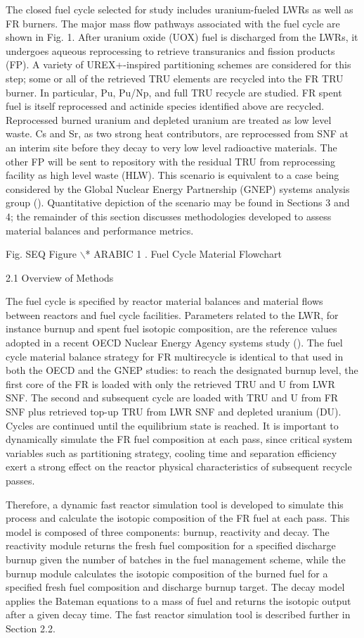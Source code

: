 	The closed fuel cycle selected for study includes uranium-fueled LWRs
as well as FR burners.  The major mass flow pathways associated with the
fuel cycle are shown in Fig. 1.  After uranium oxide (UOX) fuel is
discharged from the LWRs, it undergoes aqueous reprocessing to retrieve
transuranics and fission products (FP).  A variety of UREX+-inspired
partitioning schemes are considered for this step; some or all of the
retrieved TRU elements are recycled into the FR TRU burner.  In
particular, Pu, Pu/Np, and full TRU recycle are studied.  FR spent fuel
is itself reprocessed and actinide species identified above are
recycled. Reprocessed burned uranium and depleted uranium are treated as
low level waste. Cs and Sr, as two strong heat contributors, are
reprocessed from SNF at an interim site before they decay to very low
level radioactive materials. The other FP will be sent to repository
with the residual TRU from reprocessing facility as high level waste
(HLW).  This scenario is equivalent to a case being considered by the
Global Nuclear Energy Partnership (GNEP) systems analysis group (). 
Quantitative depiction of the scenario may be found in Sections 3 and 4;
the remainder of this section discusses methodologies developed to
assess material balances and performance metrics.

Fig.   SEQ Figure $\backslash$* ARABIC  1 . Fuel Cycle Material
Flowchart

2.1 Overview of Methods

	The fuel cycle is specified by reactor material balances and material
flows between reactors and fuel cycle facilities.  Parameters related to
the LWR, for instance burnup and spent fuel isotopic composition, are
the reference values adopted in a recent OECD Nuclear Energy Agency
systems study ().  The fuel cycle material balance strategy for FR
multirecycle is identical to that used in both the OECD and the GNEP
studies: to reach the designated burnup level, the first core of the FR
is loaded with only the retrieved TRU and U from LWR SNF. The second and
subsequent cycle are loaded with TRU and U from FR SNF plus retrieved
top-up TRU from LWR SNF and depleted uranium (DU).  Cycles are continued
until the equilibrium state is reached.  It is important to dynamically
simulate the FR fuel composition at each pass, since critical system
variables such as partitioning strategy, cooling time and separation
efficiency exert a strong effect on the reactor physical characteristics
of subsequent recycle passes. 

	Therefore, a dynamic fast reactor simulation tool is developed to
simulate this process and calculate the isotopic composition of the FR
fuel at each pass.  This model is composed of three components: burnup,
reactivity and decay.  The reactivity module returns the fresh fuel
composition for a specified discharge burnup given the number of batches
in the fuel management scheme, while the burnup module calculates the
isotopic composition of the burned fuel for a specified fresh fuel
composition and discharge burnup target.  The decay model applies the
Bateman equations to a mass of fuel and returns the isotopic output
after a given decay time.  The fast reactor simulation tool is described
further in Section 2.2.

